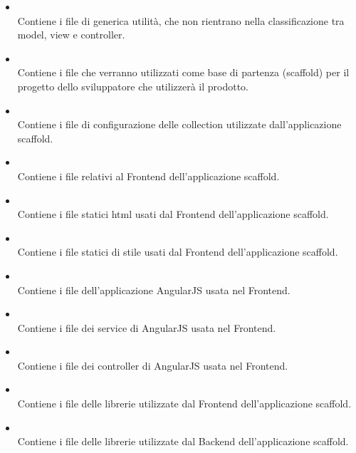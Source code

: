 \begin{itemize}
 \item \textbf{} \\
	Contiene i file di generica utilità, che non rientrano nella classificazione tra model, view e controller.

 \item \textbf{} \\
	Contiene i file che verranno utilizzati come base di partenza (scaffold) per il progetto dello sviluppatore che utilizzerà il prodotto.

 \item \textbf{} \\
	Contiene i file di configurazione delle collection utilizzate dall'applicazione scaffold.

 \item \textbf{} \\
	Contiene i file relativi al Frontend dell'applicazione scaffold.

 \item \textbf{} \\
	Contiene i file statici html usati dal Frontend dell'applicazione scaffold.

 \item \textbf{} \\
	Contiene i file statici di stile usati dal Frontend dell'applicazione scaffold.

 \item \textbf{} \\
	Contiene i file dell'applicazione AngularJS usata nel Frontend.

 \item \textbf{} \\
	Contiene i file dei service di AngularJS usata nel Frontend.

 \item \textbf{} \\
	Contiene i file dei controller di AngularJS usata nel Frontend.

 \item \textbf{} \\
	Contiene i file delle librerie utilizzate dal Frontend dell'applicazione scaffold.
	
 \item \textbf{} \\
	Contiene i file delle librerie utilizzate dal Backend dell'applicazione scaffold.


\end{itemize}

